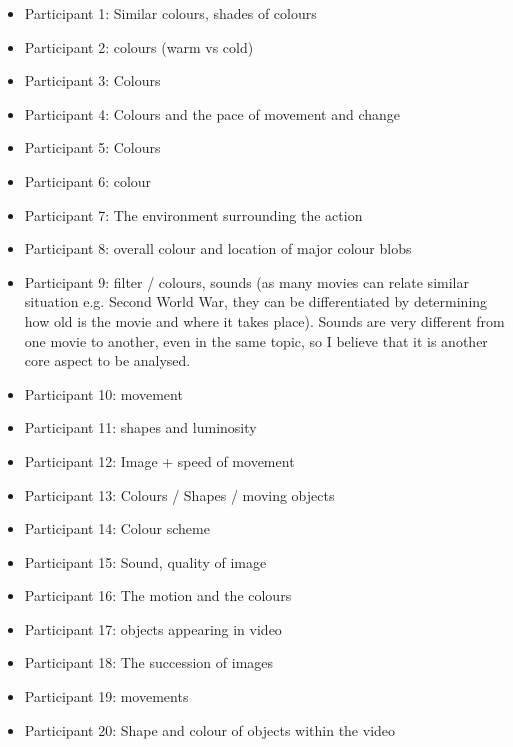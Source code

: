 \begin{itemize}
	\item Participant 1: Similar colours, shades of colours
    \item Participant 2: colours (warm vs cold) 
    \item Participant 3: Colours 
    \item Participant 4: Colours and the pace of movement and change
    \item Participant 5: Colours
    \item Participant 6: colour
    \item Participant 7: The environment surrounding the action
    \item Participant 8: overall colour and location of major colour blobs
    \item Participant 9: filter / colours, sounds (as many movies can relate similar situation e.g. Second World War, they can be differentiated by determining how old is the movie and where it takes place). Sounds are very different from one movie to another, even in the same topic, so I believe that it is another core aspect to be analysed.
    \item Participant 10: movement 
    \item Participant 11: shapes and luminosity 
    \item Participant 12: Image + speed of movement 
    \item Participant 13: Colours / Shapes / moving objects
    \item Participant 14: Colour scheme
    \item Participant 15: Sound, quality of image
    \item Participant 16: The motion and the colours
    \item Participant 17: objects appearing in video
    \item Participant 18: The succession of images
    \item Participant 19: movements
    \item Participant 20: Shape and colour of objects within the video
\end{itemize}
